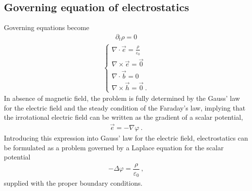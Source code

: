 \documentclass[letterpaper,10pt,english]{jupyterBook}
\begin{document}
\subsection{Governing equation of electrostatics}
\label{\detokenize{ch/regimes-electrostatics:governing-equation-of-electrostatics}}
\sphinxAtStartPar
Governing equations become
\begin{equation*}
\begin{split}\partial_t \rho = 0\end{split}
\end{equation*}\begin{equation*}
\begin{split}\begin{cases}
  \nabla \cdot \vec{e} = \frac{\rho}{\varepsilon_0} \\
  \nabla \times \vec{e} = \vec{0} \\
  \nabla \cdot \vec{b} = 0 \\
  \nabla \times \vec{h} = \vec{0} \ .
\end{cases}\end{split}
\end{equation*}
\sphinxAtStartPar
In absence of magnetic field, the problem is fully determined by the Gauss’ law for the electric field and the steady condition of the Faraday’s law, implying that the irrotational electric field can be written as the gradient of a scalar potential,
\begin{equation*}
\begin{split}\vec{e} = - \nabla \varphi \ .\end{split}
\end{equation*}
\sphinxAtStartPar
Introducing this expression into Gauss’ law for the electric field, electrostatics can be formulated as a problem governed by a Laplace equation for the scalar potential
\begin{equation*}
\begin{split}-\Delta \varphi = \dfrac{\rho}{\varepsilon_0} \ ,\end{split}
\end{equation*}
\sphinxAtStartPar
supplied with the proper boundary conditions.  
\end{document}
